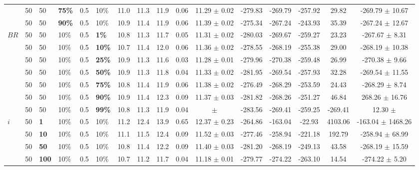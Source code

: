 \begin{sidewaystable}
\begin{tabular}{|l|l|l|l|l|l||c|c|c|c|c|c|c|c|c|c|}
    ~ & 50 & 50 & \textbf{75\%} & 0.5 & 10\% & 11.0 & 11.3 & 11.9 & 0.06 & 11.29 $\pm$ 0.02 & -279.83 & -269.79 & -257.92 & 29.82 & -269.79 $\pm$ 10.67 \\
    ~ & 50 & 50 & \textbf{90\%} & 0.5 & 10\% & 10.9 & 11.4 & 11.9 & 0.06 & 11.39 $\pm$ 0.02 & -275.34 & -267.24 & -243.93 & 35.39 & -267.24 $\pm$ 12.67 \\
    \hline
    $BR$ & 50 & 50 & 10\% & 0.5 & \textbf{1\%} & 10.8 & 11.3 & 11.7 & 0.05 & 11.31 $\pm$ 0.02 & -280.03 & -269.67 & -259.27 & 23.23 & -267.67 $\pm$ 8.31 \\
    ~    & 50 & 50 & 10\% & 0.5 & \textbf{10\%} & 10.7 & 11.4 & 12.0 & 0.06 & 11.36 $\pm$ 0.02 & -278.55 & -268.19 & -255.38 & 29.00 & -268.19 $\pm$ 10.38 \\
    ~    & 50 & 50 & 10\% & 0.5 & \textbf{25\%} & 10.9 & 11.3 & 11.6 & 0.03 & 11.28 $\pm$ 0.01 & -279.96 & -270.38 & -259.48 & 26.99 & -270.38 $\pm$ 9.66 \\
    ~    & 50 & 50 & 10\% & 0.5 & \textbf{50\%} & 10.9 & 11.3 & 11.8 & 0.04 & 11.33 $\pm$ 0.02 & -281.95 & -269.54 & -257.93 & 32.28 & -269.54 $\pm$ 11.55 \\
    ~    & 50 & 50 & 10\% & 0.5 & \textbf{75\%} & 10.8 & 11.4 & 11.9 & 0.06 & 11.38 $\pm$ 0.02 & -276.49 & -268.29 & -253.59 & 24.43 & -268.29 $\pm$ 8.74 \\
    ~    & 50 & 50 & 10\% & 0.5 & \textbf{90\%} & 10.9 & 11.4 & 12.3 & 0.09 & 11.37 $\pm$ 0.03 & -281.82 & -268.26 & -251.27 & 46.84 & 268.26 $\pm$ 16.76 \\
    ~    & 50 & 50 & 10\% & 0.5 & \textbf{99\%} & 10.8 & 11.3 & 11.9 & 0.04 &  $\pm$  &  -283.56 & -269.41 & -259.25 & -269.41 & 12.30 $\pm$  \\
    \hline
    $i$ & 50 & \textbf{1} & 10\% & 0.5 & 10\% & 11.2 & 12.4 & 13.9 & 0.65 & 12.37 $\pm$ 0.23 & -264.86 & -163.04 & -22.93 & 4103.06 & -163.04 $\pm$ 1468.26 \\
    ~   & 50 &\textbf{10} & 10\% & 0.5 & 10\% & 11.1 & 11.5 & 12.4 & 0.09 & 11.52 $\pm$ 0.03 & -277.46 & -258.94 & -221.18 & 192.79 & -258.94 $\pm$ 68.99 \\
    ~   & 50 &\textbf{50} & 10\% & 0.5 & 10\% & 10.8 & 11.4 & 12.2 & 0.09 & 11.40 $\pm$ 0.03 & -281.20 & -268.19 & -249.13 &  43.58 & -268.19 $\pm$ 15.59 \\
    ~   & 50 &\textbf{100} & 10\% & 0.5 & 10\% & 10.7 & 11.2 & 11.7 & 0.04 & 11.18 $\pm$ 0.01 & -279.77 & -274.22 & -263.10 & 14.54 & -274.22 $\pm$ 5.20 \\

\end{tabular}
\end{sidewaystable}
